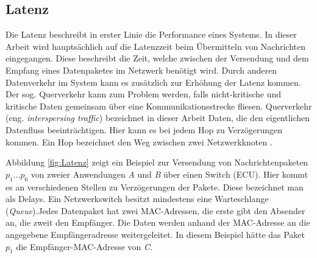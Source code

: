 \subsection{Latenz}\label{sec:Latenz}
Die Latenz beschreibt in erster Linie die Performance eines Systems. In dieser Arbeit wird hauptsächlich auf die Latenzzeit beim Übermitteln von Nachrichten eingegangen. Diese beschreibt die Zeit, welche zwischen der Versendung und dem Empfang eines Datenpaketes im Netzwerk benötigt wird. Durch anderen Datenverkehr im System kann es zusätzlich zur Erhöhung der Latenz kommen. Der sog. Querverkehr kann zum Problem werden, falls nicht-kritische und kritische Daten gemeinsam über eine Kommunikationsstrecke fliesen. Querverkehr (eng. \emph{interspersing traffic}) bezeichnet in dieser Arbeit Daten, die den eigentlichen Datenfluss beeinträchtigen. Hier kann es bei jedem Hop zu Verzögerungen kommen. Ein Hop bezeichnet den Weg zwischen zwei Netzwerkknoten \cite{GrundlagenNetwork}. \cite{ComputerNetworking} 

Abbildung \ref{fig:Latenz} zeigt ein Beispiel zur Versendung von Nachrichtenpaketen \(p_1 \dots p_6\) von zweier Anwendungen \emph{A} und \emph{B} über einen Switch (\ac{ECU}). Hier kommt es an verschiedenen Stellen zu Verzögerungen der Pakete. Diese bezeichnet man als Delays.
Ein Netzwerk\-switch besitzt mindestens eine Warteschlange (\emph{Queue}).Jedes Datenpaket hat zwei \ac{MAC}-Adressen, die erste gibt den Absender an, die zweit den Empfänger. Die Daten werden anhand der \ac{MAC}-Adresse an die angegebene Empfängeradresse weitergeleitet. In diesem Beispiel hätte das Paket \emph{\(p_1\)} die Empfänger-\ac{MAC}-Adresse von \emph{C}.


\newpage

